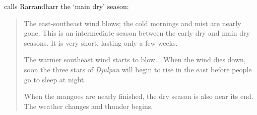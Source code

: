 \citet{davis1989} calls Rarrandharr the `main dry' season:
\blockquote{
    The east-southeast wind blows; the cold mornings and mist are nearly gone.
    This is an intermediate season between the early dry and main dry seasons.
    It is very short, lasting only a few weeks.
    
    The warmer southeast wind starts to blow...
    When the wind dies down, soon the three stars of \textit{Djulpan} will begin to rise in the east before people go to sleep at night.
    
    When the mangoes are nearly finished, the dry season is also near its end.
    The weather changes and thunder begins.
}








